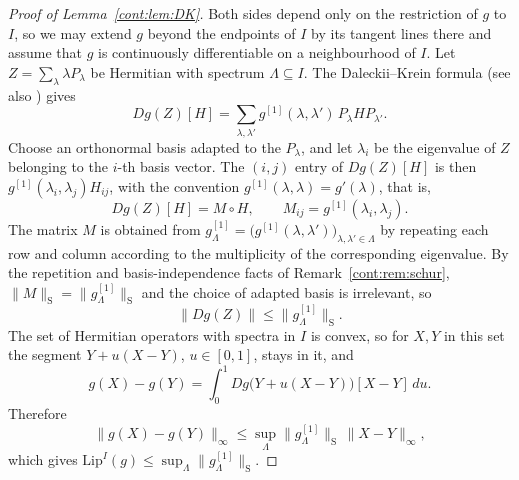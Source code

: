 \begin{proof}[Proof of Lemma~\ref{cont:lem:DK}]
Both sides depend only on the restriction of $g$ to $I$, so we may extend $g$ beyond the endpoints of $I$ by its tangent lines there and assume that $g$ is continuously differentiable on a neighbourhood of $I$. Let $Z=\sum_{\lambda}\lambda P_\lambda$ be Hermitian with spectrum $\Lambda\subseteq I$. The Daleckii--Krein formula \cite[Theorem~V.3.3]{bhatia1997matrix} (see also \cite[Theorem~3.25]{hiaipetz2014intro}) gives
\[
  Dg(Z)[H]=\sum_{\lambda,\lambda'}g^{[1]}(\lambda,\lambda')\,P_\lambda HP_{\lambda'}.
\]
Choose an orthonormal basis adapted to the $P_\lambda$, and let $\lambda_i$ be the eigenvalue of $Z$ belonging to the $i$-th basis vector. The $(i,j)$ entry of $Dg(Z)[H]$ is then $g^{[1]}(\lambda_i,\lambda_j)H_{ij}$, with the convention $g^{[1]}(\lambda,\lambda)=g'(\lambda)$, that is,
\[
  Dg(Z)[H]=M\circ H,\qquad M_{ij}=g^{[1]}(\lambda_i,\lambda_j).
\]
The matrix $M$ is obtained from $g^{[1]}_\Lambda=\big(g^{[1]}(\lambda,\lambda')\big)_{\lambda,\lambda'\in\Lambda}$ by repeating each row and column according to the multiplicity of the corresponding eigenvalue. By the repetition and basis-independence facts of Remark~\ref{cont:rem:schur}, $\|M\|_{\mathrm S}=\|g^{[1]}_\Lambda\|_{\mathrm S}$ and the choice of adapted basis is irrelevant, so
\[
  \|Dg(Z)\|\leq\|g^{[1]}_\Lambda\|_{\mathrm S}.
\]
The set of Hermitian operators with spectra in $I$ is convex, so for $X,Y$ in this set the segment $Y+u(X-Y)$, $u\in[0,1]$, stays in it, and
\[
  g(X)-g(Y)=\int_0^1Dg\big(Y+u(X-Y)\big)[X-Y]\,du.
\]
Therefore
\[
\|g(X)-g(Y)\|_\infty\leq\sup_\Lambda\|g^{[1]}_\Lambda\|_{\mathrm S}\,\|X-Y\|_\infty,
\]
which gives $\mathrm{Lip}^I(g)\leq\sup_\Lambda\|g^{[1]}_\Lambda\|_{\mathrm S}$.


\end{proof}
